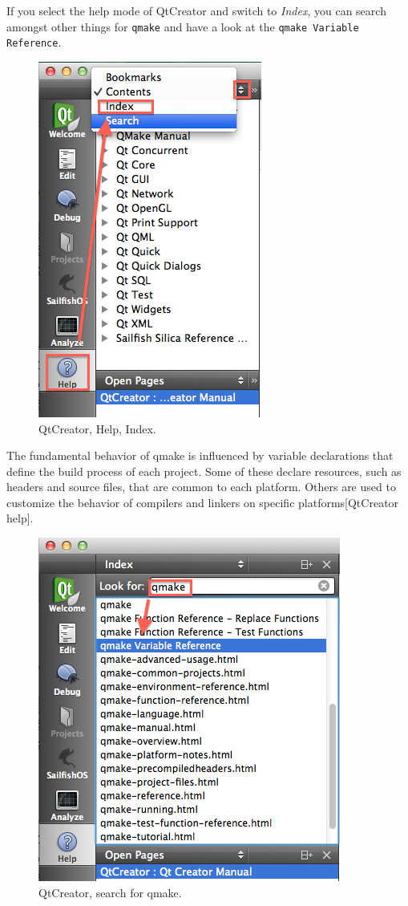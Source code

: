 If you select the help mode of QtCreator and switch to \emph{Index}, you can search amongst other things for \verb,qmake, and have a look at the \verb,qmake Variable Reference,.
%
\begin{figure}[H]
  \centering
  \includegraphics[scale=0.7]{../media/gfx/QtCreator/HelpSelectIndex.png} 
  \caption{QtCreator, Help, Index.}
  \label{fig:HelpSelectIndex}
\end{figure}
%
The fundamental behavior of qmake is influenced by variable declarations that define the build process of each project. Some of these declare resources, such as headers and source files, that are common to each platform. Others are used to customize the behavior of compilers and linkers on specific platforms[QtCreator help].
%
\begin{figure}[H]
  \centering
  \includegraphics[scale=0.7]{../media/gfx/QtCreator/HelpSearchQmake.png} 
  \caption{QtCreator, search for qmake.}
  \label{fig:HelpSearchQmake}
\end{figure}
